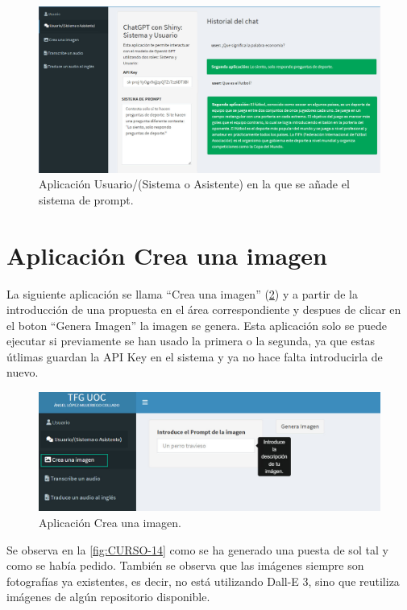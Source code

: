 \documentclass[
]{book}
\begin{document}
\begin{figure}

{\centering \includegraphics[width=0.6\linewidth]{FIG13} 

}

\caption{Aplicación Usuario/(Sistema o Asistente) en la que se añade el sistema de prompt.}\label{fig:CURSO-12}
\end{figure}

\section{Aplicación Crea una imagen}\label{aplicaciuxf3n-crea-una-imagen}

La siguiente aplicación se llama ``Crea una imagen'' (\ref{fig:CURSO-13}) y a partir de la introducción de una propuesta en el área correspondiente y despues de clicar en el boton ``Genera Imagen'' la imagen se genera. Esta aplicación solo se puede ejecutar si previamente se han usado la primera o la segunda, ya que estas útlimas guardan la API Key en el sistema y ya no hace falta introducirla de nuevo.

\begin{figure}

{\centering \includegraphics[width=0.6\linewidth]{FIG14} 

}

\caption{Aplicación Crea una imagen.}\label{fig:CURSO-13}
\end{figure}

Se observa en la \ref{fig:CURSO-14} como se ha generado una puesta de sol tal y como se había pedido. También se observa que las imágenes siempre son fotografías ya existentes, es decir, no está utilizando Dall-E 3, sino que reutiliza imágenes de algún repositorio disponible.
\end{document}
